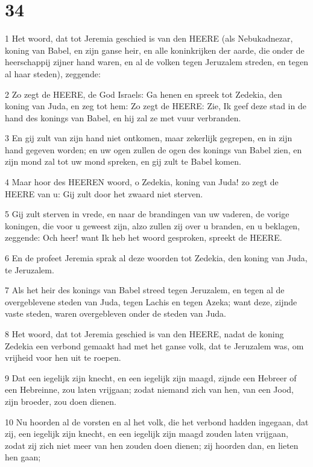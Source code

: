 \chapter{34}

\par 1 Het woord, dat tot Jeremia geschied is van den HEERE (als Nebukadnezar, koning van Babel, en zijn ganse heir, en alle koninkrijken der aarde, die onder de heerschappij zijner hand waren, en al de volken tegen Jeruzalem streden, en tegen al haar steden), zeggende:
\par 2 Zo zegt de HEERE, de God Israels: Ga henen en spreek tot Zedekia, den koning van Juda, en zeg tot hem: Zo zegt de HEERE: Zie, Ik geef deze stad in de hand des konings van Babel, en hij zal ze met vuur verbranden.
\par 3 En gij zult van zijn hand niet ontkomen, maar zekerlijk gegrepen, en in zijn hand gegeven worden; en uw ogen zullen de ogen des konings van Babel zien, en zijn mond zal tot uw mond spreken, en gij zult te Babel komen.
\par 4 Maar hoor des HEEREN woord, o Zedekia, koning van Juda! zo zegt de HEERE van u: Gij zult door het zwaard niet sterven.
\par 5 Gij zult sterven in vrede, en naar de brandingen van uw vaderen, de vorige koningen, die voor u geweest zijn, alzo zullen zij over u branden, en u beklagen, zeggende: Och heer! want Ik heb het woord gesproken, spreekt de HEERE.
\par 6 En de profeet Jeremia sprak al deze woorden tot Zedekia, den koning van Juda, te Jeruzalem.
\par 7 Als het heir des konings van Babel streed tegen Jeruzalem, en tegen al de overgeblevene steden van Juda, tegen Lachis en tegen Azeka; want deze, zijnde vaste steden, waren overgebleven onder de steden van Juda.
\par 8 Het woord, dat tot Jeremia geschied is van den HEERE, nadat de koning Zedekia een verbond gemaakt had met het ganse volk, dat te Jeruzalem was, om vrijheid voor hen uit te roepen.
\par 9 Dat een iegelijk zijn knecht, en een iegelijk zijn maagd, zijnde een Hebreer of een Hebreinne, zou laten vrijgaan; zodat niemand zich van hen, van een Jood, zijn broeder, zou doen dienen.
\par 10 Nu hoorden al de vorsten en al het volk, die het verbond hadden ingegaan, dat zij, een iegelijk zijn knecht, en een iegelijk zijn maagd zouden laten vrijgaan, zodat zij zich niet meer van hen zouden doen dienen; zij hoorden dan, en lieten hen gaan;
